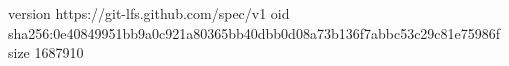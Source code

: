 version https://git-lfs.github.com/spec/v1
oid sha256:0e40849951bb9a0c921a80365bb40dbb0d08a73b136f7abbc53c29c81e75986f
size 1687910
